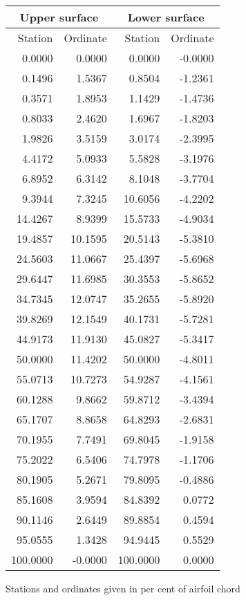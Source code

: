 \documentclass[11pt]{book}
\begin{document}
 \hspace{4mm}
 \begin{tabular}{|r|r|r|r|} \hline 
 \multicolumn{2}{|c|}{Upper surface} & \multicolumn{2}{|c|}{Lower surface} \\
 \hline
 Station & Ordinate & Station & Ordinate \\
 \hline
0.0000 & 0.0000 & 0.0000 & -0.0000 \\
0.1496 & 1.5367 & 0.8504 & -1.2361 \\
0.3571 & 1.8953 & 1.1429 & -1.4736 \\
0.8033 & 2.4620 & 1.6967 & -1.8203 \\
1.9826 & 3.5159 & 3.0174 & -2.3995 \\
4.4172 & 5.0933 & 5.5828 & -3.1976 \\
6.8952 & 6.3142 & 8.1048 & -3.7704 \\
9.3944 & 7.3245 & 10.6056 & -4.2202 \\
14.4267 & 8.9399 & 15.5733 & -4.9034 \\
19.4857 & 10.1595 & 20.5143 & -5.3810 \\
24.5603 & 11.0667 & 25.4397 & -5.6968 \\
29.6447 & 11.6985 & 30.3553 & -5.8652 \\
34.7345 & 12.0747 & 35.2655 & -5.8920 \\
39.8269 & 12.1549 & 40.1731 & -5.7281 \\
44.9173 & 11.9130 & 45.0827 & -5.3417 \\
50.0000 & 11.4202 & 50.0000 & -4.8011 \\
55.0713 & 10.7273 & 54.9287 & -4.1561 \\
60.1288 & 9.8662 & 59.8712 & -3.4394 \\
65.1707 & 8.8658 & 64.8293 & -2.6831 \\
70.1955 & 7.7491 & 69.8045 & -1.9158 \\
75.2022 & 6.5406 & 74.7978 & -1.1706 \\
80.1905 & 5.2671 & 79.8095 & -0.4886 \\
85.1608 & 3.9594 & 84.8392 & 0.0772 \\
90.1146 & 2.6449 & 89.8854 & 0.4594 \\
95.0555 & 1.3428 & 94.9445 & 0.5529 \\
100.0000 & -0.0000 & 100.0000 & 0.0000 \\
 \hline 
 \end{tabular}
 \vspace{8mm}

Stations and ordinates given in per cent of airfoil chord
\end{document}
